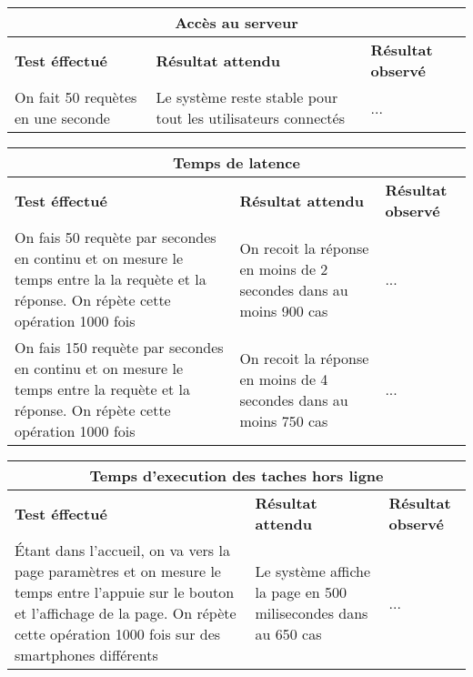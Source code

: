 \documentclass{article}
\begin{document}
  \begin{center}
    \begin{tabular}{|p{5cm}|p{5cm}|p{5cm}|}
      \hline
      \multicolumn{3}{|c|}{\textbf{Accès au serveur}} \\
      \hline
      \textbf{Test éffectué} & \textbf{Résultat attendu} & \textbf{Résultat observé} \\
      \hline

      On fait 50 requètes en une seconde&
      Le système reste stable pour tout les utilisateurs connectés&
      ... \\


      \hline

    \end{tabular}
  \end{center}

  \begin{center}
    \begin{tabular}{|p{5cm}|p{5cm}|p{5cm}|}
      \hline
      \multicolumn{3}{|c|}{\textbf{Temps de latence}} \\
      \hline
      \textbf{Test éffectué} & \textbf{Résultat attendu} & \textbf{Résultat observé} \\
      \hline

      On fais 50 requète par secondes en continu et on mesure le temps entre la la requète et la réponse. On répète cette opération 1000 fois&
      On recoit la réponse en moins de 2 secondes dans au moins 900 cas&
      ... \\

      \hline
      \hline
      On fais 150 requète par secondes en continu et on mesure le temps entre la requète et la réponse. On répète cette opération 1000 fois&
      On recoit la réponse en moins de 4 secondes dans au moins 750 cas&
      ... \\

      \hline

    \end{tabular}
  \end{center}

  \begin{center}
    \begin{tabular}{|p{5cm}|p{5cm}|p{5cm}|}
      \hline
      \multicolumn{3}{|c|}{\textbf{Temps d’execution des taches hors ligne}} \\
      \hline
      \textbf{Test éffectué} & \textbf{Résultat attendu} & \textbf{Résultat observé} \\
      \hline

      Étant dans l'accueil, on va vers la page paramètres et on mesure le temps entre l'appuie sur le bouton et l'affichage de la page. On répète cette opération 1000 fois sur des smartphones différents&
      Le système affiche la page en 500 milisecondes dans au 650 cas&
      ... \\


      \hline

    \end{tabular}
  \end{center}
\end{document}

